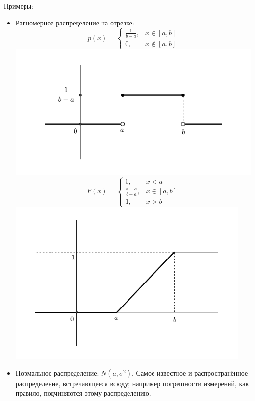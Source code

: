     Примеры:

    \begin{itemize}
        \item Равномерное распределение на отрезке:
            \[
                p(x) =
                \begin{cases}
                    \frac{1}{b-a}, &x \in [a, b]\\
                    0, &x \not\in [a, b]
                \end{cases}
            \]
            \includegraphics[width=13cm]{Lec_8_2.pdf}
            \[
                F(x) =
                \begin{cases}
                    0, &x < a\\
                    \frac{x-a}{b-a}, &x \in [a, b]\\
                    1, &x > b
                \end{cases}
            \]
            \includegraphics[width=12cm]{Lec_8_3.pdf}

        \item Нормальное распределение: $N(a, \sigma^2)$. Самое известное и распространённое распределение,
            встречающееся всюду; например погрешности измерений, как правило, подчиняются этому распределению.


\end{itemize}
